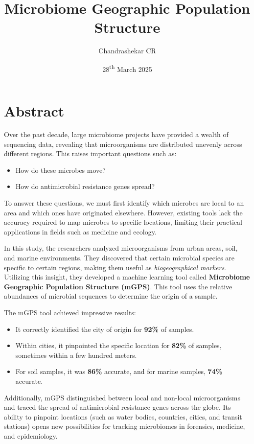 \documentclass{article}
\begin{document}
\title{Microbiome Geographic Population Structure}
\author{Chandrashekar CR}
\date{28\textsuperscript{th} March 2025}
\maketitle

\section{Abstract}
Over the past decade, large microbiome projects have provided a wealth of sequencing data, 
revealing that microorganisms are distributed unevenly across different regions. 
This raises important questions such as:

\begin{itemize}
    \item How do these microbes move?
    \item How do antimicrobial resistance genes spread?
\end{itemize}

To answer these questions, we must first identify which microbes are local to an area and which ones have originated elsewhere. However, existing tools lack the accuracy required to map microbes to specific locations, limiting their practical applications in fields such as medicine and ecology.

In this study, the researchers analyzed microorganisms from urban areas, soil, and marine environments. They discovered that certain microbial species are specific to certain regions, making them useful as \textit{biogeographical markers}. Utilizing this insight, they developed a machine learning tool called \textbf{Microbiome Geographic Population Structure (mGPS)}. This tool uses the relative abundances of microbial sequences to determine the origin of a sample.

The mGPS tool achieved impressive results:

\begin{itemize}
    \item It correctly identified the city of origin for \textbf{92\%} of samples.
    \item Within cities, it pinpointed the specific location for \textbf{82\%} of samples, sometimes within a few hundred meters.
    \item For soil samples, it was \textbf{86\%} accurate, and for marine samples, \textbf{74\%} accurate.
\end{itemize}

Additionally, mGPS distinguished between local and non-local microorganisms and traced the spread of antimicrobial resistance genes across the globe. Its ability to pinpoint locations (such as water bodies, countries, cities, and transit stations) opens new possibilities for tracking microbiomes in forensics, medicine, and epidemiology.






\end{document}
